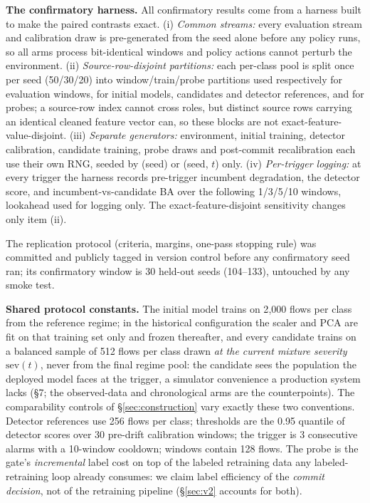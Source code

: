 \documentclass[a4paper,fleqn]{cas-sc}
\begin{document}
\textbf{The confirmatory harness.} All confirmatory results come from a harness built to make the paired contrasts exact. (i) \emph{Common streams:} every evaluation stream and calibration draw is pre-generated from the seed alone before any policy runs, so all arms process bit-identical windows and policy actions cannot perturb the environment. (ii) \emph{Source-row-disjoint partitions:} each per-class pool is split once per seed (50/30/20) into window/train/probe partitions used respectively for evaluation windows, for initial models, candidates and detector references, and for probes; a source-row index cannot cross roles, but distinct source rows carrying an identical cleaned feature vector can, so these blocks are not exact-feature-value-disjoint. (iii) \emph{Separate generators:} environment, initial training, detector calibration, candidate training, probe draws and post-commit recalibration each use their own RNG, seeded by (seed) or (seed, $t$) only. (iv) \emph{Per-trigger logging:} at every trigger the harness records pre-trigger incumbent degradation, the detector score, and incumbent-vs-candidate BA over the following 1/3/5/10 windows, lookahead used for logging only. The exact-feature-disjoint sensitivity changes only item (ii).

The replication protocol (criteria, margins, one-pass stopping rule) was committed and publicly tagged in version control before any confirmatory seed ran; its confirmatory window is 30 held-out seeds (104--133), untouched by any smoke test.


\textbf{Shared protocol constants.} The initial model trains on 2{,}000 flows per class from the reference regime; in the historical configuration the scaler and PCA are fit on that training set only and frozen thereafter, and every candidate trains on a balanced sample of 512 flows per class drawn \emph{at the current mixture severity} $\mathrm{sev}(t)$, never from the final regime pool: the candidate sees the population the deployed model faces at the trigger, a simulator convenience a production system lacks (\S7; the observed-data and chronological arms are the counterpoints). The comparability controls of \S\ref{sec:construction} vary exactly these two conventions. Detector references use 256 flows per class; thresholds are the 0.95 quantile of detector scores over 30 pre-drift calibration windows; the trigger is 3 consecutive alarms with a 10-window cooldown; windows contain 128 flows. The probe is the gate's \emph{incremental} label cost on top of the labeled retraining data any labeled-retraining loop already consumes: we claim label efficiency of the \emph{commit decision}, not of the retraining pipeline (\S\ref{sec:v2} accounts for both).
\end{document}
